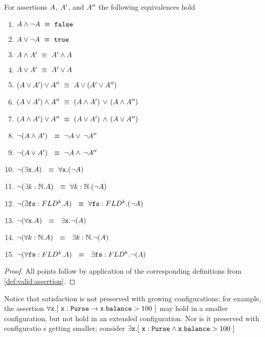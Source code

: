 \begin{lemma}
For     assertions $A$, $A'$, and $A''$ the following equivalences hold
\label{lemma:basic_assertions_classical}
\begin{enumerate}
\item
$ A \wedge\neg A \ \equiv \  {\mbox{\tt{false}}}$
\item
$ A \vee \neg A   \ \equiv \  {\mbox{\tt{true}}}$
\item
$ A \wedge A'  \ \equiv \  A' \wedge A$
\item
$ A \vee A'  \ \equiv \  A' \vee A$
\item
$(A \vee A') \vee A'' \ \equiv \  A \vee (A' \vee A'')$
\item
$(A \vee A') \wedge A'' \ \equiv \  (A \wedge A')\, \vee\, (A \wedge A'')$
\item
$(A \wedge A') \vee A'' \ \equiv \  (A \vee A')\, \wedge\, (A \vee A'')$
\item
$\neg (A \wedge A') \  \ \equiv \  \neg  A   \vee\, \neg A''$
\item
$\neg (A \vee A') \  \ \equiv \  \neg  A   \wedge\, \neg A''$
\item
$\neg (\exists \prg{x}.\A )  \  \ \equiv \  \forall \prg{x}.(\neg  \A)$
\item
$\neg (\exists k:\mathbb{N}.\A )  \  \ \equiv \  \forall  k:\mathbb{N}.(\neg  \A)$
\item
$\neg (\exists {\mbox{\tt{fs}}}:FLD^k.A )  \  \ \equiv \  \forall {\mbox{\tt{fs}}}:FLD^k.(\neg  A)$
\item
$\neg (\forall \prg{x}. \A)  \  \ \equiv \  \  \exists \prg{x}.\neg(\A )$
\item
$\neg (\forall k:\mathbb{N}. \A)  \  \ \equiv \  \  \exists k:\mathbb{N}.\neg(\A )$
\item
$\neg (\forall {\mbox{\tt{fs}}}:FLD^k. A)  \  \ \equiv \  \  \exists {\mbox{\tt{fs}}}:FLD^k.\neg(A )$
\end{enumerate}
\end{lemma}
\begin{proof}
All points follow by application of the corresponding definitions from \ref{def:valid:assertion}.
 \end{proof}

Notice that satisfaction is not preserved with growing configurations; for example, the assertion $\forall {\mbox{\tt{x}}}. [\ {\mbox{\tt{x}}} : {\mbox{\tt{Purse}}} \rightarrow {\mbox{\tt{x}}}.{\mbox{\tt{balance}}}>100\ ]$ may hold in a smaller configuration, but not hold in an extended configuration. Nor is it preserved with configuratio s getting smaller; consider \eg $\exists {\mbox{\tt{x}}}. [\ {\mbox{\tt{x}}} : {\mbox{\tt{Purse}}} \wedge {\mbox{\tt{x}}}.{\mbox{\tt{balance}}}>100\ ]$

